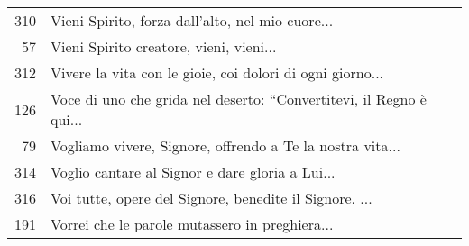 {\begin{flushleft}
\begin{longtable}{r m{11cm}}
    310 & Vieni Spirito, forza dall'alto, nel mio cuore...\\
    57 & Vieni Spirito creatore, vieni, vieni...\\
    312 & Vivere la vita con le gioie, coi dolori di ogni giorno...\\
    126 & Voce di uno che grida nel deserto: ``Convertitevi, il Regno è qui...\\
    79 & Vogliamo vivere, Signore, offrendo a Te la nostra vita...\\
    314 & Voglio cantare al Signor e dare gloria a Lui...\\
    316 & Voi tutte, opere del Signore, benedite il Signore. ...\\
    191 & Vorrei che le parole mutassero in preghiera...\\
  \end{longtable}
\end{flushleft}
}